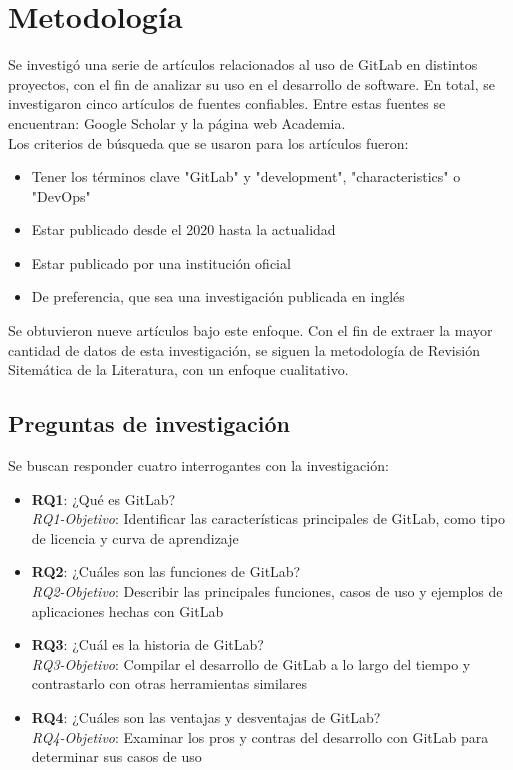 \documentclass[runningheads]{llncs}
\begin{document}
\section{Metodología}
Se investigó una serie de artículos relacionados al uso de GitLab en distintos proyectos, con el fin
de analizar su uso en el desarrollo de software. En total, se investigaron cinco artículos de fuentes confiables.
Entre estas fuentes se encuentran: Google Scholar y la página web Academia.\\
Los criterios de búsqueda que se usaron para los artículos fueron:
\begin{itemize}
        \item Tener los términos clave "GitLab" y "development", "characteristics" o "DevOps"
        \item Estar publicado desde el 2020 hasta la actualidad
        \item Estar publicado por una institución oficial
        \item De preferencia, que sea una investigación publicada en inglés
\end{itemize}
Se obtuvieron nueve artículos bajo este enfoque. Con el fin de extraer la mayor cantidad de datos de
esta investigación, se siguen la metodología de Revisión Sitemática de la Literatura, con un enfoque
cualitativo.
\subsection{Preguntas de investigación}
Se buscan responder cuatro interrogantes con la investigación:
\begin{itemize}
        \item \textbf{RQ1}: ¿Qué es GitLab?\\
        \textit{RQ1-Objetivo}: Identificar las características principales de GitLab, como tipo de licencia y curva de aprendizaje
        \item \textbf{RQ2}: ¿Cuáles son las funciones de GitLab?\\
        \textit{RQ2-Objetivo}: Describir las principales funciones, casos de uso y ejemplos de aplicaciones hechas con GitLab
        \item \textbf{RQ3}: ¿Cuál es la historia de GitLab?\\
        \textit{RQ3-Objetivo}: Compilar el desarrollo de GitLab a lo largo del tiempo y contrastarlo con otras herramientas similares
        \item \textbf{RQ4}: ¿Cuáles son las ventajas y desventajas de GitLab?\\
        \textit{RQ4-Objetivo}: Examinar los pros y contras del desarrollo con GitLab para determinar sus casos de uso
\end{itemize}
\end{document}
